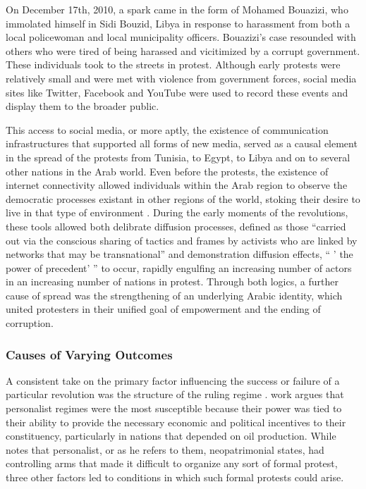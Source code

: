 On December 17th, 2010, a spark came in the form of Mohamed Bouazizi, who immolated himself in Sidi Bouzid, Libya in response to harassment from both a local policewoman and local municipality officers.  Bouazizi's case resounded with others who were tired of being harassed and vicitimized by a corrupt government. These individuals took to the streets in protest.  Although early protests were relatively small and were met with violence from government forces, social media sites like Twitter, Facebook and YouTube were used to record these events and display them to the broader public.  

This access to social media, or more aptly, the existence of communication infrastructures that supported all forms of new media\citep{wolfsfeld_social_2013,tufekci_social_2012}, served as a causal element in the spread of the protests from Tunisia, to Egypt, to Libya and on to several other nations in the Arab world.  Even before the protests, the existence of internet connectivity allowed individuals within the Arab region to observe the democratic processes existant in other regions of the world, stoking their desire to live in that type of environment \cite{hussain_what_2013}. During the early moments of the revolutions, these tools allowed both delibrate diffusion processes, defined as those ``carried out via the conscious sharing of tactics and frames by activists who are linked by networks that may be transnational'' and demonstration diffusion effects,  `` ' the power of precedent' '' to occur, rapidly engulfing an increasing number of actors in an increasing number of nations in protest.  Through both logics, a further cause of spread was the strengthening of an underlying Arabic identity, which united protesters in their unified goal of empowerment and the ending of corruption. 
	
\subsubsection{Causes of Varying Outcomes}
A consistent take on the primary factor influencing the success or failure of a particular revolution was the structure of the ruling regime \cite{bellin_reconsidering_2012,comunello_will_2012,goldstone_bringing_2013} .   work argues that personalist regimes were the most susceptible because their power was tied to their ability to provide the necessary economic and political incentives to their constituency, particularly in nations that depended on oil production.  While \cite{comunello_will_2012} notes that personalist, or as he refers to them, neopatrimonial states, had controlling arms that made it difficult to organize any sort of formal protest, three other factors led to conditions in which such formal protests could arise.


